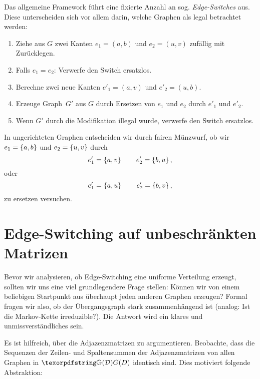 Das  allgemeine Framework führt eine fixierte Anzahl an sog. \emph{Edge-Switches} aus.
Diese unterscheiden sich vor allem darin, welche Graphen als legal betrachtet werden:
\begin{enumerate}
    \item Ziehe aus $G$ zwei Kanten $e_1 = (a,b)$ und $e_2 = (u,v)$ zufällig mit Zurücklegen.
    \item Falls $e_1 = e_2$: Verwerfe den Switch ersatzlos.

    \item Berechne zwei neue Kanten $e'_1 = (a, v)$ und $e'_2 = (u, b)$.

    \item Erzeuge Graph~$G'$ aus $G$ durch Ersetzen von $e_1$ und $e_2$ durch $e'_1$ und $e'_2$.

    \item Wenn $G'$ durch die Modifikation illegal wurde, verwerfe den Switch ersatzlos.
\end{enumerate}

In  ungerichteten Graphen entscheiden wir durch fairen Münzwurf, ob wir $e_1 = \left\{a,b\right\}$ und $e_2 = \left\{u, v\right\}$ durch
\begin{equation}
    e'_1 = \left\{a, v\right\} \qquad e'_2 = \left\{b, u\right\},
\end{equation}
oder
\begin{equation}
    e'_1 = \left\{a, u\right\} \qquad e'_2 = \left\{b, v\right\},
\end{equation}
zu ersetzen versuchen.

\section{Edge-Switching auf unbeschränkten Matrizen}\label{sec:edge_switching_irreduzibel}
Bevor wir analysieren, ob Edge-Switching eine uniforme Verteilung erzeugt, sollten wir uns eine viel grundlegendere Frage stellen:
Können wir von einem beliebigen Startpunkt aus überhaupt jeden anderen Graphen erzeugen?
Formal fragen wir also, ob der Übergangsgraph stark zusammenhängend ist (analog: Ist die Markov-Kette irreduzible?).
Die Antwort wird ein klares und unmissverständliches  sein.

\bigskip

Es ist hilfreich, über die Adjazenzmatrizen zu argumentieren.
Beobachte, dass die Sequenzen der Zeilen- und Spaltensummen der Adjazenzmatrizen von allen Graphen in $\gd$ identisch sind.
Dies motiviert folgende Abstraktion:

